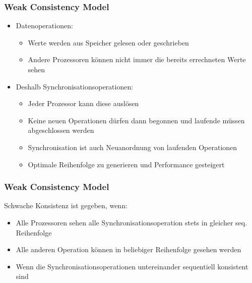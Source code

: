 \documentclass{sikslides}
\begin{document}
\begin{frame}
	\frametitle{Weak Consistency Model}
	\begin{itemize}
		\item Datenoperationen: \bigskip
		\begin{itemize}
			\item Werte werden aus Speicher gelesen oder geschrieben \bigskip
			\item Andere Prozessoren können nicht immer die bereits errechneten Werte sehen \bigskip
		\end{itemize}
		\item Deshalb Synchronisationsoperationen: \bigskip
			\begin{itemize}
			\item Jeder Prozessor kann diese auslösen \bigskip
			\item Keine neuen Operationen dürfen dann begonnen und laufende müssen abgeschlossen werden \bigskip
			\item Synchronisation ist auch Neuanordnung von laufenden Operationen \bigskip
			\item Optimale Reihenfolge zu generieren und Performance gesteigert
			\end{itemize}
	\end{itemize}
\end{frame}
\note{\newline

}


\begin{frame}
	\frametitle{Weak Consistency Model}
 Schwache Konsistenz ist gegeben, wenn: \bigskip
	\begin{itemize}
		\item Alle Prozessoren sehen alle Synchronisationsoperation stets in gleicher seq. Reihenfolge \bigskip
		\item Alle anderen Operation können in beliebiger Reihenfolge gesehen werden \bigskip
		\item Wenn die Synchronisationsoperationen untereinander sequentiell konsistent sind
	\end{itemize}
\end{frame}
\end{document}
